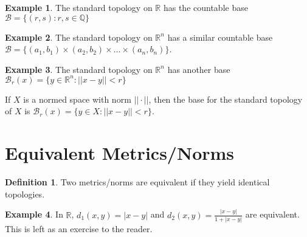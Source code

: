 \documentclass{article}
\theoremstyle{definition}
\newtheorem{definition}{Definition}
\newtheorem{exampled}{Example}[definition]
\begin{document}
\begin{exampled}
	The standard topology on $\mathbb{R}$ has the countable base $\mathcal{B}=\{(r, s) : r, s \in \mathbb{Q}\}$
\end{exampled}
\begin{exampled}
	The standard topology on $\mathbb{R}^n$ has a similar countable base $\mathcal{B}=\{(a_1, b_1)\times(a_2, b_2)\times\dots\times(a_n, b_n)\}$.
\end{exampled}
\begin{exampled}
	The standard topology on $\mathbb{R}^n$ has another base $\mathcal{B}_r(x)=\{y\in\mathbb{R}^n:||x-y||<r\}$
\end{exampled}

\noindent
If $X$ is a normed space with norm $||\cdot||$, then the base for the standard topology of $X$ is $\mathcal{B}_r(x)=\{y\in X:||x-y||<r\}$.

\section{Equivalent Metrics/Norms}
\begin{definition}
	Two metrics/norms are equivalent if they yield identical topologies.
\end{definition}
\begin{exampled}
	In $\mathbb{R}$, $d_1(x, y)=|x-y|$ and $d_2(x, y)=\frac{|x-y|}{1+|x-y|}$ are equivalent. This is left as an exercise to the reader.
\end{exampled}
\end{document}
